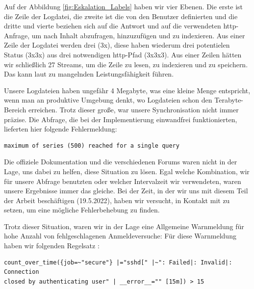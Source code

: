 Auf der Abbildung \ref{fig:Eskalation_Labels} haben wir vier Ebenen. Die erste ist die Zeile der Logdatei, die zweite ist die von den Benutzer definierten  und die dritte und vierte beziehen sich auf die Antwort und auf die verwendeten \gls{http}-Anfrage, um nach Inhalt abzufragen, hinzuzufügen und zu indexieren. Aus einer Zeile der Logdatei werden drei  (3x), diese haben wiederum drei potentielen Status (3x3x) aus drei notwendigen \gls{http}-Pfad (3x3x3). Aus einer Zeilen hätten wir schließlich 27 Streams, um die Zeile zu lesen, zu indexieren und zu speichern. Das kann laut \cite{Grafana_labels} zu mangelnden Leistungsfähigkeit führen.

Unsere Logdateien haben ungefähr 4 Megabyte, was eine kleine Menge entspricht, wenn man an produktive Umgebung denkt, wo Logdateien schon den Terabyte-Bereich erreichen. Trotz dieser große, war unsere Synchronisation nicht immer präzise. Die Abfrage, die bei der Implementierung einwandfrei funktionierten, lieferten hier folgende Fehlermeldung:

{
\begin{Verbatim}[fontsize=\small, frame=single]
maximum of series (500) reached for a single query  
\end{Verbatim}
}

Die offiziele Dokumentation und die verschiedenen Forums waren nicht in der Lage, uns dabei zu helfen, diese Situation zu lösen. Egal welche Kombination, wir für unsere Abfrage benutzten oder welcher Intervalzeit wir verwendeten, waren unsere Ergebnisse immer das gleiche. Bei der Zeit, in der wir uns mit diesem Teil der Arbeit beschäftigen (19.5.2022), haben wir versucht, in Kontakt mit  zu setzen, um eine mögliche Fehlerbehebung zu finden.

Trotz dieser Situation, waren wir in der Lage eine Allgemeine Warnmeldung für hohe Anzahl von fehlgeschlagenen Anmeldeversuche: Für diese Warnmeldung haben wir folgenden Regelsatz \citep{VoidQuark_sshlogs}:

{
\begin{Verbatim}[fontsize=\small, frame=single]
count_over_time({job=~"secure"} |="sshd[" |~": Failed|: Invalid|: Connection
closed by authenticating user" | __error__="" [15m]) > 15
\end{Verbatim}
}



